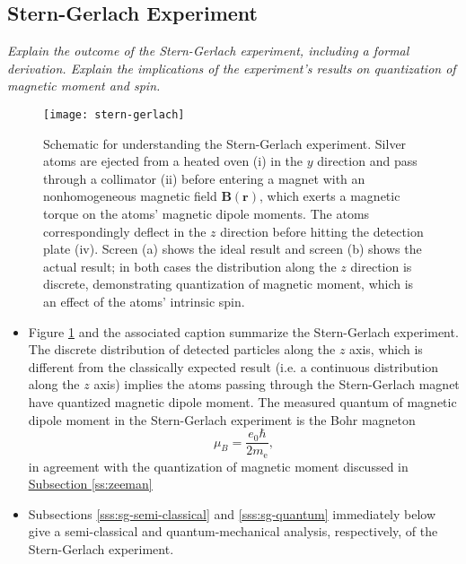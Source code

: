 \documentclass[11pt, a4paper]{article}
\newcommand{\SG}{Stern-Gerlach\xspace}
\renewcommand{\vec}[1]{\bm{#1}}  %
\renewcommand{\r}{\vec{r}}  %
\newcommand{\B}{\vec{B}}  %
\begin{document}
\subsection{Stern-Gerlach Experiment}

\textit{Explain the outcome of the Stern-Gerlach experiment, including a formal derivation. Explain the implications of the experiment's results on quantization of magnetic moment and spin.}

\begin{figure}[htb!]
    \centering
    \texttt{[image: stern-gerlach]}
    \caption{Schematic for understanding the Stern-Gerlach experiment. Silver atoms are ejected from a heated oven (i) in the $ y $ direction and pass through a collimator (ii) before entering a magnet with an nonhomogeneous magnetic field $ \B(\r) $, which exerts a magnetic torque on the atoms' magnetic dipole moments. The atoms correspondingly deflect in the $ z $ direction before hitting the detection plate (iv). Screen (a) shows the ideal result and screen (b) shows the actual result; in both cases the distribution along the $ z $ direction is discrete, demonstrating quantization of magnetic moment, which is an effect of the atoms' intrinsic spin.}
    \label{fig:stern-gerlach}
\end{figure}

\begin{itemize}
    \item Figure \ref{fig:stern-gerlach} and the associated caption summarize the Stern-Gerlach experiment. The discrete distribution of detected particles along the $ z $ axis, which is different from the classically expected result (i.e. a continuous distribution along the $ z $ axis) implies the atoms passing through the \SG magnet have quantized magnetic dipole moment. The measured quantum of magnetic dipole moment in the \SG experiment is the Bohr magneton
    \begin{equation*}
        \mu_{B} = \frac{e_{0}\hbar}{2m_{\text{e}}},
    \end{equation*}
    in agreement with the quantization of magnetic moment discussed in \hyperref[ss:zeeman]{\underline{Subsection \ref{ss:zeeman}}}
    
    \item Subsections \ref{sss:sg-semi-classical} and \ref{sss:sg-quantum} immediately below give a semi-classical and quantum-mechanical analysis, respectively, of the Stern-Gerlach experiment.

\end{itemize}
\end{document}
